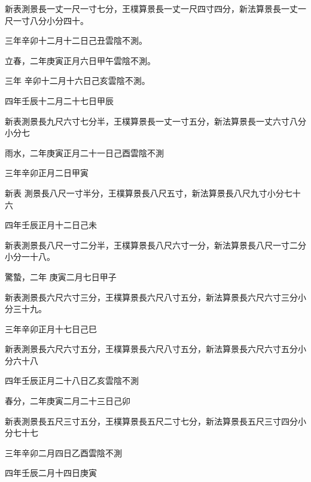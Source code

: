\begin{pinyinscope}
 新表測景長一丈一尺一寸七分，王樸算景長一丈一尺四寸四分，新法算景長一丈一尺一寸八分小分四十。



 三年辛卯十二月十二日己丑雲陰不測。



 立春，二年庚寅正月六日甲午雲陰不測。



 三年
 辛卯十二月十六日己亥雲陰不測。



 四年壬辰十二月二十七日甲辰



 新表測景長九尺六寸七分半，王樸算景長一丈一寸五分，新法算景長一丈六寸八分小分七



 雨水，二年庚寅正月二十一日己酉雲陰不測



 三年辛卯正月二日甲寅



 新表
 測景長八尺一寸半分，王樸算景長八尺五寸，新法算景長八尺九寸小分七十六



 四年壬辰正月十二日己未



 新表測景長八尺一寸二分半，王樸算景長八尺六寸一分，新法算景長八尺一寸二分小分一十八。



 驚蟄，二年
 庚寅二月七日甲子



 新表測景長六尺六寸三分，王樸算景長六尺八寸五分，新法算景長六尺六寸三分小分三十九。



 三年辛卯正月十七日己巳



 新表測景長六尺六寸五分，王樸算景長六尺八寸五分，新法算景長六尺六寸五分小分六十八



 四年壬辰正月二十八日乙亥雲陰不測



 春分，二年庚寅二月二十三日己卯



 新表測景長五尺三寸五分，王樸算景長五尺二寸七分，新法算景長五尺三寸四分小分七十七



 三年辛卯二月四日乙酉雲陰不測



 四年壬辰二月十四日庚寅




\end{pinyinscope}
